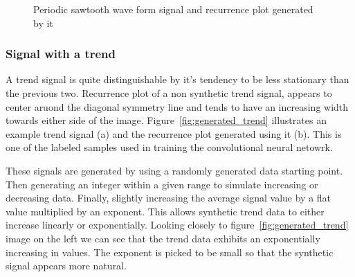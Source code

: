 \documentclass[a4paper,12pt,fleqn]{article}
\begin{document}
\begin{figure}
  \centering
  \qquad
  \caption{Periodic sawtooth wave form signal and recurrence plot generated by it}
  \label{fig:generated_periodic_sawtooth}
\end{figure}


\subsubsection{Signal with a trend}
A trend signal is quite distinguishable by it's tendency to be less stationary than the previous two.
Recurrence plot of a non synthetic trend signal, appears to center aruond the diagonal symmetry line and tends to have an increasing width towards either side of the image.
Figure~\ref{fig:generated_trend} illustrates an example trend signal (a) and the recurrence plot generated using it (b).
This is one of the labeled samples used in training the convolutional neural netowrk.

These signals are generated by using a randomly generated data starting point. Then generating an integer within a given range to simulate increasing or decreasing data.
Finally, slightly increasing the average signal value by a flat value multiplied by an exponent.
This allows synthetic trend data to either increase linearly or exponentially.
Looking closely to figure~\ref{fig:generated_trend} image on the left we can see that the trend data exhibits an exponentially increasing in values.
The exponent is picked to be small so that the synthetic signal appears more
natural.
\end{document}
